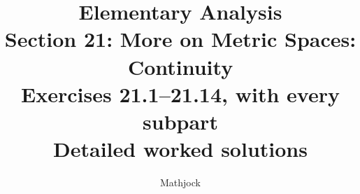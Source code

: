 
\title{\textbf{Elementary Analysis}\\[0.3em]
Section 21: More on Metric Spaces: Continuity\\[0.4em]
\large Exercises 21.1--21.14, with every subpart\\
Detailed worked solutions}
\author{Mathjock}
\date{}

\maketitle
\bookinfo
\tableofcontents
\clearpage
\setcounter{section}{20}



